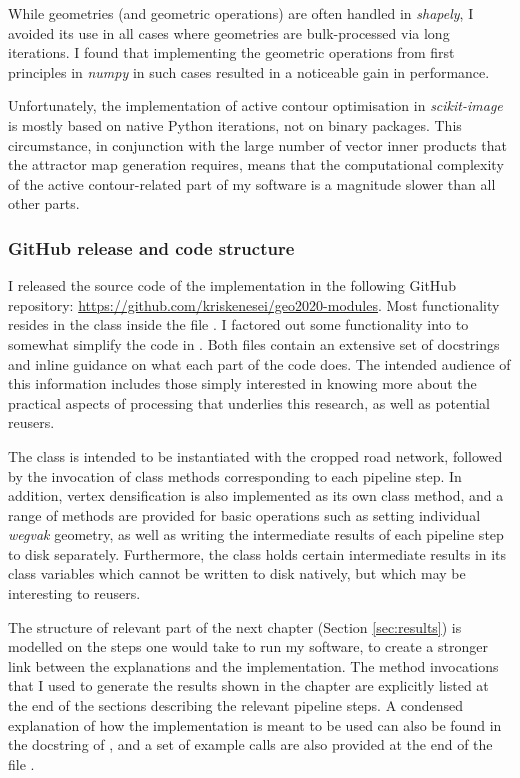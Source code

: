 While geometries (and geometric operations) are often handled in \textit{shapely}, I avoided its use in all cases where geometries are bulk-processed via long iterations. I found that implementing the geometric operations from first principles in \textit{numpy} in such cases resulted in a noticeable gain in performance.

Unfortunately, the implementation of active contour optimisation in \textit{scikit-image} is mostly based on native Python iterations, not on binary packages. This circumstance, in conjunction with the large number of vector inner products that the attractor map generation requires, means that the computational complexity of the active contour-related part of my software is a magnitude slower than all other parts.

\subsubsection{GitHub release and code structure}

I released the source code of the implementation in the following GitHub repository:
\url{https://github.com/kriskenesei/geo2020-modules}. Most functionality resides in the class  inside the file . I factored out some functionality into  to somewhat simplify the code in . Both files contain an extensive set of docstrings and inline guidance on what each part of the code does. The intended audience of this information includes those simply interested in knowing more about the practical aspects of processing that underlies this research, as well as potential reusers.

The class  is intended to be instantiated with the cropped road network, followed by the invocation of class methods corresponding to each pipeline step. In addition, vertex densification is also implemented as its own class method, and a range of methods are provided for basic operations such as setting individual \textit{wegvak} geometry, as well as writing the intermediate results of each pipeline step to disk separately. Furthermore, the class holds certain intermediate results in its class variables which cannot be written to disk natively, but which may be interesting to reusers.

The structure of relevant part of the next chapter (Section \ref{sec:results}) is modelled on the steps one would take to run my software, to create a stronger link between the explanations and the implementation. The method invocations that I used to generate the results shown in the chapter are explicitly listed at the end of the sections describing the relevant pipeline steps. A condensed explanation of how the implementation is meant to be used can also be found in the docstring of , and a set of example calls are also provided at the end of the file .